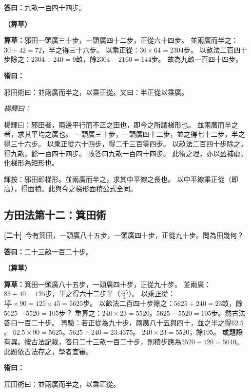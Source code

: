 \documentclass[11pt,a4paper]{article}
\newenvironment{method}{%
  \par\noindent\textcolor{methodcolor}{\textbf{術曰：}}%
  \ignorespaces
}{\par\vspace{0.5em}}
\newenvironment{caocao}{%
  \par\noindent\textcolor{caocaocolor}{\small\textbf{（算草）}}%
  \ignorespaces
}{\par\vspace{0.5em}}
\newenvironment{yanghuicomment}{%
  \par\noindent\textcolor{commentarycolor}{\small\textit{楊輝曰：}}%
  \ignorespaces
}{\par\vspace{0.5em}}
\newcommand{\problemnum}[1]{\textbf{[\ignorespaces#1\unskip]}}
\begin{document}
\noindent\textcolor{answercolor}{\textbf{答曰：}}九畝一百四十四步。

\begin{caocao}
\textbf{算草：}邪田一頭廣三十步，一頭廣四十二步，正從六十四步。
並兩廣而半之：$30 + 42 = 72$，半之得三十六步。
以乘正從：$36 \times 64 = 2304$步。
以畝法二百四十步除之：$2304 \div 240 = 9$畝，餘$2304 - 2160 = 144$步。
故為九畝一百四十四步。
\end{caocao}

\begin{method}
邪田術曰：並兩廣而半之，以乘正從。又曰：半正從以乘廣。
\end{method}

\begin{yanghuicomment}
楊輝曰：邪田者，兩邊平行而不正之田也，即今之所謂梯形也。
並兩廣而半之者，求其平均之廣也。
一頭廣三十步，一頭廣四十二步，並之得七十二步，半之得三十六步。
以乘正從六十四步，得二千三百零四步。
以畝法二百四十步除之，得九畝，餘一百四十四步。
故答曰九畝一百四十四步。
此術之理，亦以盈補虛，化梯形為矩形也。

輝按：邪田即梯形。並兩廣而半之，求其中平線之長也。
以中平線乘正從（即高），得面積。此與今之梯形面積公式全同。
\end{yanghuicomment}

\subsection{方田法第十二：箕田術}

\noindent\problemnum{二十}\,
今有箕田，一頭廣八十五步，一頭廣四十步，正從九十步。問為田幾何？

\noindent\textcolor{answercolor}{\textbf{答曰：}}二十三畝一百二十步。

\begin{caocao}
\textbf{算草：}箕田一頭廣八十五步，一頭廣四十步，正從九十步。
並兩廣：$85 + 40 = 125$步，半之得六十二步半（$\frac{125}{2}$）。
以乘正從：$\frac{125}{2} \times 90 = 125 \times 45 = 5625$步。
以畝法二百四十步除之：$5625 \div 240 = 23$畝，餘$5625 - 5520 = 105$步？
重算之：$240 \times 23 = 5520$。$5625 - 5520 = 105$步。然古法答曰一百二十步。
再驗：若正從為九十步，兩廣八十五與四十，並之半之得$62.5$。
$62.5 \times 90 = 5625$。$5625 \div 240 = 23.4375$。
$240 \times 23 = 5520$，餘$105$。
或題設有異。按古法記載，答曰二十三畝一百二十步，則積步應為$5520 + 120 = 5640$。
此題依古法存之，學者宜審。
\end{caocao}

\begin{method}
箕田術曰：並兩廣而半之，以乘正從。
\end{method}
\end{document}
